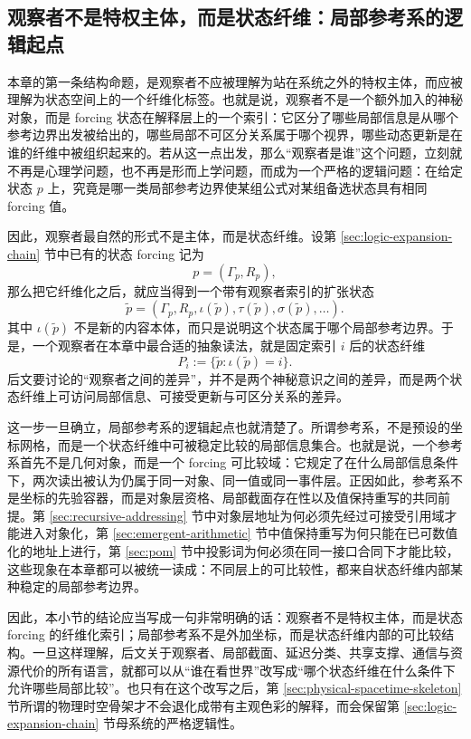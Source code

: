 \subsection{观察者不是特权主体，而是状态纤维：局部参考系的逻辑起点}\label{subsec:physical-spacetime-skeleton-observer-fiber}

本章的第一条结构命题，是观察者不应被理解为站在系统之外的特权主体，而应被理解为状态空间上的一个纤维化标签。也就是说，观察者不是一个额外加入的神秘对象，而是 forcing 状态在解释层上的一个索引：它区分了哪些局部信息是从哪个参考边界出发被给出的，哪些局部不可区分关系属于哪个视界，哪些动态更新是在谁的纤维中被组织起来的。若从这一点出发，那么“观察者是谁”这个问题，立刻就不再是心理学问题，也不再是形而上学问题，而成为一个严格的逻辑问题：在给定状态 \(p\) 上，究竟是哪一类局部参考边界使某组公式对某组备选状态具有相同 forcing 值。

因此，观察者最自然的形式不是主体，而是状态纤维。设第 \ref{sec:logic-expansion-chain} 节中已有的状态 forcing 记为
\[
p=(\Gamma_p,R_p),
\]
那么把它纤维化之后，就应当得到一个带有观察者索引的扩张状态
\[
\widetilde p=(\Gamma_p,R_p,\iota(\widetilde p),\tau(\widetilde p),\sigma(\widetilde p),\ldots).
\]
其中 \(\iota(\widetilde p)\) 不是新的内容本体，而只是说明这个状态属于哪个局部参考边界。于是，一个观察者在本章中最合适的抽象读法，就是固定索引 \(i\) 后的状态纤维
\[
P_i:=\{\widetilde p:\iota(\widetilde p)=i\}.
\]
后文要讨论的“观察者之间的差异”，并不是两个神秘意识之间的差异，而是两个状态纤维上可访问局部信息、可接受更新与可区分关系的差异。

这一步一旦确立，局部参考系的逻辑起点也就清楚了。所谓参考系，不是预设的坐标网格，而是一个状态纤维中可被稳定比较的局部信息集合。也就是说，一个参考系首先不是几何对象，而是一个 forcing 可比较域：它规定了在什么局部信息条件下，两次读出被认为仍属于同一对象、同一值或同一事件层。正因如此，参考系不是坐标的先验容器，而是对象层资格、局部截面存在性以及值保持重写的共同前提。第 \ref{sec:recursive-addressing} 节中对象层地址为何必须先经过可接受引用域才能进入对象化，第 \ref{sec:emergent-arithmetic} 节中值保持重写为何只能在已可数值化的地址上进行，第 \ref{sec:pom} 节中投影词为何必须在同一接口合同下才能比较，这些现象在本章都可以被统一读成：不同层上的可比较性，都来自状态纤维内部某种稳定的局部参考边界。

因此，本小节的结论应当写成一句非常明确的话：观察者不是特权主体，而是状态 forcing 的纤维化索引；局部参考系不是外加坐标，而是状态纤维内部的可比较结构。一旦这样理解，后文关于观察者、局部截面、延迟分类、共享支撑、通信与资源代价的所有语言，就都可以从“谁在看世界”改写成“哪个状态纤维在什么条件下允许哪些局部比较”。也只有在这个改写之后，第 \ref{sec:physical-spacetime-skeleton} 节所谓的物理时空骨架才不会退化成带有主观色彩的解释，而会保留第 \ref{sec:logic-expansion-chain} 节母系统的严格逻辑性。
